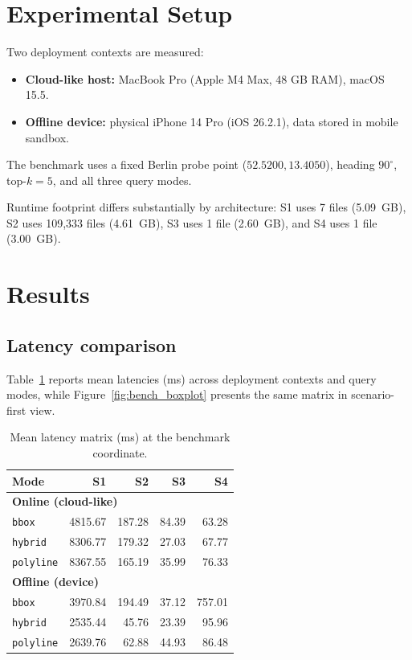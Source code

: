 \documentclass[conference]{IEEEtran}
\begin{document}
\section{Experimental Setup}
Two deployment contexts are measured:
\begin{itemize}
\item \textbf{Cloud-like host:} MacBook Pro (Apple M4 Max, 48 GB RAM), macOS 15.5.
\item \textbf{Offline device:} physical iPhone 14 Pro (iOS 26.2.1), data stored in mobile sandbox.
\end{itemize}

The benchmark uses a fixed Berlin probe point (\(52.5200,13.4050\)), heading \(90^\circ\), top-\(k=5\), and all three query modes.

Runtime footprint differs substantially by architecture: S1 uses 7 files (\SI{5.09}{GB}), S2 uses 109{,}333 files (\SI{4.61}{GB}), S3 uses 1 file (\SI{2.60}{GB}), and S4 uses 1 file (\SI{3.00}{GB}).

\section{Results}
\subsection{Latency comparison}
Table~\ref{tab:bench_joint} reports mean latencies (ms) across deployment contexts and query modes, while Figure~\ref{fig:bench_boxplot} presents the same matrix in scenario-first view.

\begin{table}[!t]
\caption{Mean latency matrix (\si{\milli\second}) at the benchmark coordinate.}
\label{tab:bench_joint}
\centering
\footnotesize
\setlength{\tabcolsep}{3pt}
\begin{tabular}{lrrrr}
\toprule
Mode & S1 & S2 & S3 & S4 \\
\midrule
\multicolumn{5}{l}{\textbf{Online (cloud-like)}} \\
\texttt{bbox}     & 4815.67 & 187.28 & 84.39 & 63.28 \\
\texttt{hybrid}   & 8306.77 & 179.32 & 27.03 & 67.77 \\
\texttt{polyline} & 8367.55 & 165.19 & 35.99 & 76.33 \\
\midrule
\multicolumn{5}{l}{\textbf{Offline (device)}} \\
\texttt{bbox}     & 3970.84 & 194.49 & 37.12 & 757.01 \\
\texttt{hybrid}   & 2535.44 & 45.76 & 23.39 & 95.96 \\
\texttt{polyline} & 2639.76 & 62.88 & 44.93 & 86.48 \\
\bottomrule
\end{tabular}
\end{table}
\end{document}
